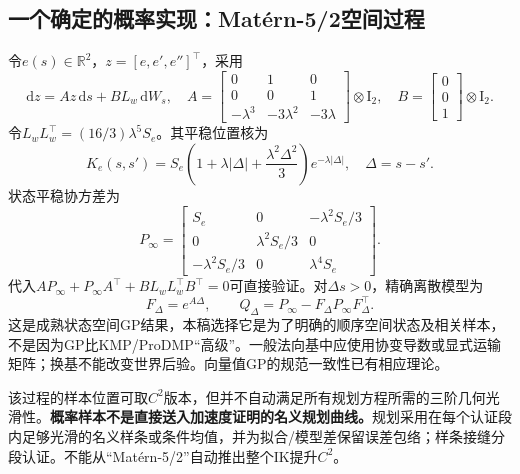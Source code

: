 \documentclass[UTF8,11pt,a4paper,fontset=fandol]{ctexart}
\numberwithin{equation}{section}
\theoremstyle{definition}
\newcommand{\R}{\mathbb R}
\newcommand{\dd}{\mathrm d}
\newcommand{\Id}{\mathrm I}
\begin{document}
\subsection{一个确定的概率实现：Mat\'ern-5/2空间过程}
令$e(s)\in\R^2$，$z=[e,e',e'']^\top$，采用
\begin{equation}
 \dd z=Az\,\dd s+BL_w\,\dd W_s,
 \quad
 A=\begin{bmatrix}0&1&0\\0&0&1\\-\lambda^3&-3\lambda^2&-3\lambda\end{bmatrix}\otimes\Id_2,
 \quad B=\begin{bmatrix}0\\0\\1\end{bmatrix}\otimes\Id_2.
 \label{eq:ssgp}
\end{equation}
令$L_wL_w^\top=(16/3)\lambda^5S_e$。其平稳位置核为
\begin{equation}
 K_e(s,s')=S_e\left(1+\lambda|\Delta|+\frac{\lambda^2\Delta^2}{3}\right)e^{-\lambda|\Delta|},
 \quad\Delta=s-s'.
 \label{eq:matern}
\end{equation}
状态平稳协方差为
\begin{equation}
 P_\infty=
 \begin{bmatrix}
 S_e&0&-\lambda^2S_e/3\\
 0&\lambda^2S_e/3&0\\
 -\lambda^2S_e/3&0&\lambda^4S_e
 \end{bmatrix}.
 \label{eq:pinf}
\end{equation}
代入$AP_\infty+P_\infty A^\top+B L_wL_w^\top B^\top=0$可直接验证。对$\Delta s>0$，精确离散模型为
\begin{equation}
 F_\Delta=e^{A\Delta},\qquad
 Q_\Delta=P_\infty-F_\Delta P_\infty F_\Delta^\top.
 \label{eq:discretegp}
\end{equation}
这是成熟状态空间GP结果\cite{hartikainen2010}，本稿选择它是为了明确的顺序空间状态及相关样本，不是因为GP比KMP/ProDMP“高级”。一般法向基中应使用协变导数或显式运输矩阵；换基不能改变世界后验。向量值GP的规范一致性已有相应理论\cite{hutchinson2021}。

该过程的样本位置可取$C^2$版本，但并不自动满足所有规划方程所需的三阶几何光滑性。\textbf{概率样本不是直接送入加速度证明的名义规划曲线。}规划采用在每个认证段内足够光滑的名义样条或条件均值，并为拟合/模型差保留误差包络；样条接缝分段认证。不能从“Mat\'ern-5/2”自动推出整个IK提升$C^2$。
\end{document}
